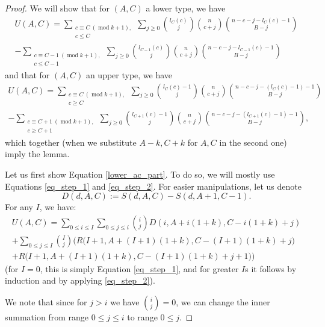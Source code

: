 \documentclass[10pt,a4paper]{amsart}
\newcommand\modd{\operatorname{mod}}
\begin{document}
\begin{proof}
    We will show that for $(A, C)$ a lower type, we have
    \begin{multline}
    \label{lower_ac_part}
        U(A, C) = \sum_{\substack{c \equiv C \ (\modd k+1), \\ c \leqslant C}} \sum_{j \geqslant 0} \binom{l_C(c)}{j} \binom{n}{c+j} \binom{n-c-j-l_C(c)-1}{B-j}\\ - \sum_{\substack{c \equiv C-1 \ (\modd k+1), \\ c \leqslant C-1}} \sum_{j \geqslant 0} \binom{l_{C-1}(c)}{j} \binom{n}{c+j} \binom{n-c-j-l_{C-1}(c)-1}{B-j}
    \end{multline}
    and that for $(A, C)$ an upper type, we have
    \begin{multline}
    \label{upper_ac_part}
        U(A, C) = \sum_{\substack{c \equiv C \ (\modd k+1), \\ c \geqslant C}} \sum_{j \geqslant 0} \binom{l_{C}(c)-1}{j} \binom{n}{c+j} \binom{n-c-j-(l_{C}(c)-1)-1}{B-j}\\ - \sum_{\substack{c \equiv C+1 \ (\modd k+1), \\ c \geqslant C+1}} \sum_{j \geqslant 0} \binom{l_{C+1}(c)-1}{j} \binom{n}{c+j} \binom{n-c-j-(l_{C+1}(c)-1)-1}{B-j},
    \end{multline}
    which together (when we substitute $A-k, C+k$ for $A, C$ in the second one) imply the lemma.

    Let us first show Equation \ref{lower_ac_part}. To do so, we will mostly use Equations \ref{eq_step_1} and \ref{eq_step_2}. For easier manipulations, let us denote
    \begin{equation*}
        D(d, A, C) := S(d, A, C) - S(d, A+1, C-1).
    \end{equation*}
    For any $I$, we have:
    \begin{multline*}
        U(A, C) = \sum_{0 \leqslant i \leqslant I} \sum_{0 \leqslant j \leqslant i} \binom{i}{j} D(i, A+i(1+k), C-i(1+k)+j)\\
        + \sum_{0 \leqslant j \leqslant I} \binom{I}{j} \bigg( R\Big(I+1, A+(I+1)(1+k), C-(I+1)(1+k)+j\Big)\\ + R\Big(I+1, A+(I+1)(1+k), C-(I+1)(1+k)+j+1\Big) \bigg)
    \end{multline*}
    (for $I=0$, this is simply Equation \ref{eq_step_1}, and for greater $I$s it follows by induction and by applying \ref{eq_step_2}).

    We note that since for $j > i$ we have $\binom{i}{j}=0$, we can change the inner summation from range $0 \leqslant j \leqslant i$ to range $0 \leqslant j$.
    

\end{proof}
\end{document}
